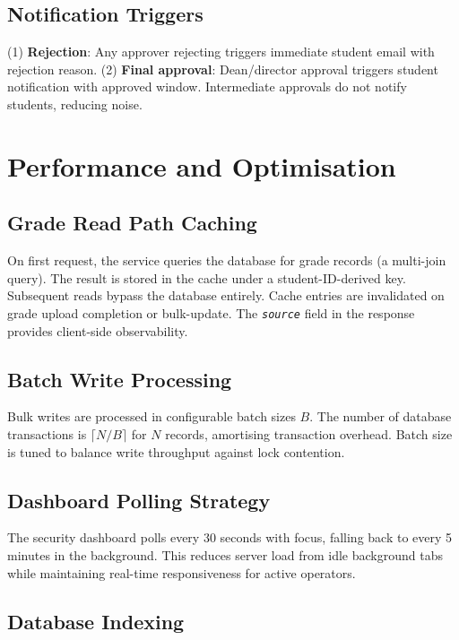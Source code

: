 \documentclass[12pt,a4paper]{report}
\newcommand{\field}[1]{\texttt{\textit{#1}}}
\begin{document}
\section{Notification Triggers}

(1) \textbf{Rejection}: Any approver rejecting triggers immediate student email with rejection reason. (2) \textbf{Final approval}: Dean/director approval triggers student notification with approved window. Intermediate approvals do not notify students, reducing noise.

\chapter{Performance and Optimisation}

\section{Grade Read Path Caching}

On first request, the service queries the database for grade records (a multi-join query). The result is stored in the cache under a student-ID-derived key. Subsequent reads bypass the database entirely. Cache entries are invalidated on grade upload completion or bulk-update. The \field{source} field in the response provides client-side observability.

\section{Batch Write Processing}

Bulk writes are processed in configurable batch sizes $B$. The number of database transactions is $\lceil N/B \rceil$ for $N$ records, amortising transaction overhead. Batch size is tuned to balance write throughput against lock contention.

\section{Dashboard Polling Strategy}

The security dashboard polls every 30 seconds with focus, falling back to every 5 minutes in the background. This reduces server load from idle background tabs while maintaining real-time responsiveness for active operators.

\section{Database Indexing}
\end{document}

